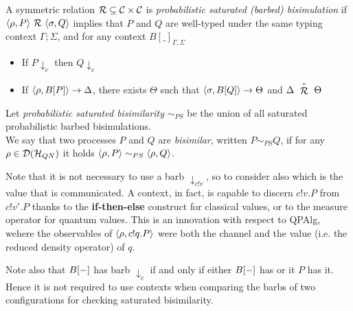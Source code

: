 \begin{definition}
	A symmetric relation $\mathcal{R} \subseteq \mathcal{C} \times \mathcal{C}$ is \emph{probabilistic saturated (barbed) bisimulation} if $\confw{\rho, P} \ \rel\ \confw{\sigma, Q}$ implies that $P$ and $Q$  are well-typed under the same typing context $\Gamma; \Sigma$, and for any context $B[\_]_{\Gamma, \Sigma}$
	\begin{itemize}
		\item If $P \downarrow_{c}$ then $Q \downarrow_{c}$
		\item If $\langle\rho, B[P]\rangle \rightarrow \Delta$, there exists $\Theta$ such that $\langle\sigma, B[Q]\rangle \rightarrow \Theta$ and $\Delta\ \slift{\rel}\ \Theta$
	\end{itemize}
	Let \emph{probabilistic saturated bisimilarity} $\sim_{PS}$ be the union of all saturated probabilistic barbed bisimulations. \\
	We say that two {processes} $P$ and $Q$ are \emph{bisimilar}, written $P \sim_{PS} Q$, if for any $\rho \in \mathcal{D}(\mathcal{H}_{QN})$ it holds $\langle\rho, P\rangle \sim_{PS} \langle\rho, Q\rangle$.
\end{definition}

Note that it is not necessary to use a barb $\downarrow_{c!v}$, so to consider also which is the value that is communicated. A context, in fact, is capable to discern $c!v.P$ from $c!v'.P$ thanks to the \textbf{if-then-else} construct for classical values, or to the measure operator for quantum values. This is an innovation with respect to QPAlg, wehere the observables of $\langle\rho, c!q.P\rangle$ were both the channel and the value (i.e. the reduced density operator) of $q$. 

Note also that $B[{-}]$ has barb $\downarrow_c$ if and only if either $B[{-}]$ has or it $P$ has it. Hence it is not required to use contexts when comparing the barbs of two configurations for checking saturated bisimilarity. 



